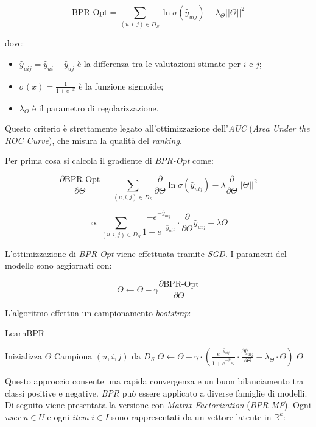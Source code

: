 \[
\text{BPR-Opt} = \sum_{(u, i, j) \in D_S} \ln \sigma(\hat{y}_{uij}) - \lambda_\Theta ||\Theta||^2
\]

dove:

\begin{itemize}
    \item $\hat{y}_{uij} = \hat{y}_{ui} - \hat{y}_{uj}$ è la differenza tra le valutazioni stimate per $i$ e $j$;
    \item $\sigma(x) = \frac{1}{1 + e^{-x}}$ è la funzione sigmoide;
    \item $\lambda_\Theta$ è il parametro di regolarizzazione.
\end{itemize}

Questo criterio è strettamente legato all'ottimizzazione dell'\textit{AUC} (\textit{Area Under the ROC Curve}), che misura la qualità del \textit{ranking}.

Per prima cosa si calcola il gradiente di \textit{BPR-Opt} come:

\[
\frac{\partial \text{BPR-Opt}}{\partial \Theta} =
\sum_{(u,i,j) \in D_S} 
\frac{\partial}{\partial \Theta} \ln \sigma(\hat{y}_{uij}) - 
\lambda \frac{\partial}{\partial \Theta} ||\Theta||^2
\]

\[
\propto 
\sum_{(u,i,j) \in D_S} 
\frac{-e^{-\hat{y}_{uij}}}{1 + e^{-\hat{y}_{uij}}} 
\cdot \frac{\partial}{\partial \Theta} \hat{y}_{uij} 
- \lambda \Theta
\]

L'ottimizzazione di \textit{BPR-Opt} viene effettuata tramite \textit{SGD}. I parametri del modello sono aggiornati con:

\[
\Theta \gets \Theta - \gamma \frac{\partial \text{BPR-Opt}}{\partial \Theta}
\]


L'algoritmo effettua un campionamento \textit{bootstrap}:

\begin{algorithm}[htbp]
\caption{LearnBPR}
\begin{algorithmic}[1]
    \State Inizializza $\Theta$
    \Repeat
        \State Campiona $(u, i, j)$ da $D_S$
        \State $\Theta \gets \Theta + \gamma \cdot \left( \frac{e^{-\hat{y}_{uij}}}{1 + e^{-\hat{y}_{uij}}} \cdot \frac{\partial \hat{y}_{uij}}{\partial \Theta} - \lambda_\Theta \cdot \Theta \right)$
    \State \Return $\Theta$
\EndProcedure
\end{algorithmic}
\end{algorithm}

Questo approccio consente una rapida convergenza e un buon bilanciamento tra classi positive e negative. \textit{BPR} può essere applicato a diverse famiglie di modelli. Di seguito viene presentata la versione con \textit{Matrix Factorization} (\textit{BPR-MF}). Ogni \textit{user} $u \in U$ e ogni \textit{item} $i \in I$ sono rappresentati da un vettore latente in $\mathbb{R}^k$:

